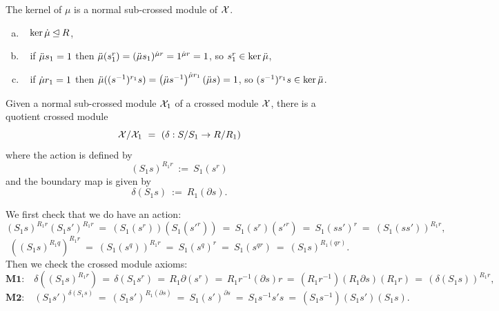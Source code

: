 \begin{lem}  
The kernel of $\mu$ is a normal sub-crossed module of $\mathcal{X}$.
\end{lem}
\begin{pf}
\begin{enumerate}[(a)]
\item~ $\ker\dot{\mu} \unlhd R$,
\item~ if $\ddot{\mu} s_1 = 1$ then 
$\ddot{\mu}(s_1^r) = (\ddot{\mu} s_1)^{\dot{\mu} r} = 1^{\dot{\mu} r} = 1$, 
so $s_1^r \in \ker\ddot{\mu}$, 
\item~ if $\dot{\mu} r_1 = 1$ then 
$\ddot{\mu}((s^{-1})^{r_1}s) 
 = \left(\ddot{\mu} s^{-1}\right)^{\dot{\mu} r_1}\left(\ddot{\mu} s\right) 
 = 1$,
so $(s^{-1})^{r_1}s \in \ker\ddot{\mu}$. 
\end{enumerate}
\end{pf}

\begin{thm}
Given a normal sub-crossed module $\mathcal{X}_1$
of a crossed module $\mathcal{X}$, there is a quotient crossed module
$$
\mathcal{X}/\mathcal{X}_1 ~=~ ( \delta : S/S_1 \to R/R_1 )
$$
where the action is defined by
$$
(S_1s)^{R_1r} ~:=~ S_1(s^r)
$$
and the boundary map is given by
$$
\delta (S_1s) ~:=~ R_1(\partial s).
$$
\end{thm}
\begin{pf}
We first check that we do have an action:
$$
(S_1s)^{R_1r}(S_1s')^{R_1r} ~=~
(S_1(s^r))(S_1({s'}^r)) ~=~
S_1(s^r)({s'}^r) ~=~
S_1(ss')^r ~=~
(S_1(ss'))^{R_1r},
$$
$$
((S_1s)^{R_1q})^{R_1r} ~=~
(S_1(s^q))^{R_1r} ~=~
S_1(s^q)^r ~=~
S_1(s^{qr}) ~=~
(S_1s)^{R_1(qr)}.
$$
Then we check the crossed module axioms:
$$
\textbf{M1:}\quad
\delta((S_1s)^{R_1r}) \,=\,
\delta(S_1 s^r) \,=\,
R_1 \partial(s^r) \,=\,
R_1 r^{-1}(\partial s)r \,=\,
(R_1r^{-1})(R_1 \partial s)(R_1r) \,=\,
(\delta(S_1s))^{R_1r},
$$
$$
\textbf{M2:}\quad
(S_1s')^{\delta(S_1s)} ~=~
(S_1s')^{R_1(\partial s)} ~=~
S_1 (s')^{\partial s} ~=~
S_1 s^{-1}s's ~=~
(S_1 s^{-1})(S_1 s')(S_1 s).\qquad\qquad\qquad
$$
\end{pf}

